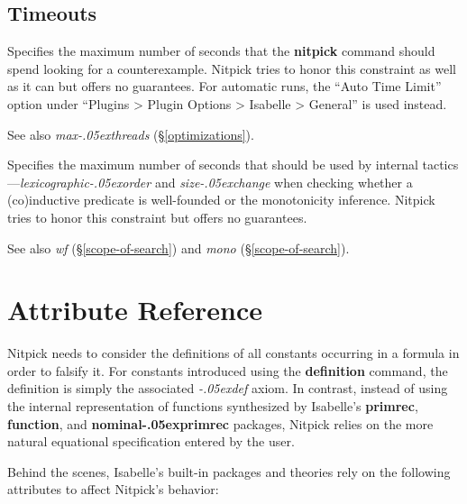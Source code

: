 \documentclass[a4paper,12pt]{article}
\renewcommand\_{\hbox{\textunderscore\kern-.05ex}}
\begin{document}
\subsection{Timeouts}
\label{timeouts}

\begin{enum}
Specifies the maximum number of seconds that the \textbf{nitpick} command should
spend looking for a counterexample. Nitpick tries to honor this constraint as
well as it can but offers no guarantees. For automatic runs, the ``Auto Time
Limit'' option under ``Plugins > Plugin Options > Isabelle > General'' is used
instead.

\nopagebreak
{\small See also \textit{max\_threads} (\S\ref{optimizations}).}

\opdefault{tac\_timeout}{float}{\upshape 0.5}
Specifies the maximum number of seconds that should be used by internal
tactics---\textit{lexicographic\_order} and \textit{size\_change} when checking
whether a (co)in\-duc\-tive predicate is well-founded or the monotonicity
inference. Nitpick tries to honor this constraint but offers no guarantees.

\nopagebreak
{\small See also \textit{wf} (\S\ref{scope-of-search}) and
\textit{mono} (\S\ref{scope-of-search}).}
\end{enum}

\section{Attribute Reference}
\label{attribute-reference}

Nitpick needs to consider the definitions of all constants occurring in a
formula in order to falsify it. For constants introduced using the
\textbf{definition} command, the definition is simply the associated
\textit{\_def} axiom. In contrast, instead of using the internal representation
of functions synthesized by Isabelle's \textbf{primrec}, \textbf{function}, and
\textbf{nominal\_primrec} packages, Nitpick relies on the more natural
equational specification entered by the user.

Behind the scenes, Isabelle's built-in packages and theories rely on the
following attributes to affect Nitpick's behavior:
\end{document}

